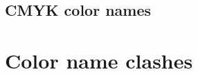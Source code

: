 \documentclass[DIV=9, captions=tableheading]{scrartcl}
\newcommand*{\colorproof}[2][]{%
  \texttt{[image: proof-spec-\#1-\#2.mps]}%
  \hspace{5pt}%
  \nolinkurl{#2}%
}
\begin{document}


\clearpage
\subsection{CMYK color names}
\label{sec:cmyknames}




\clearpage
\section{Color name clashes}
\label{sec:nameclashes}

\begingroup
\renewcommand*{\colorproof}[2][]{%
  \texttt{[image: proof-spec-svgnam-def-\#2.mps]}%
  \texttt{[image: proof-spec-dvipsnam-def-\#2.mps]}%
  \hspace{5pt}%
  \nolinkurl{#2}%
}

\endgroup
\end{document}

